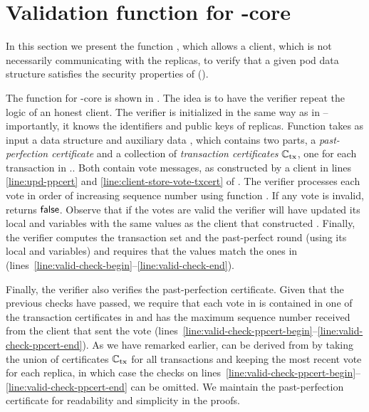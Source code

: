 \section{Validation function for \podtm-core}\label{sec:pod-core-valid}
In this section we present the function \opValid{}, which allows a \podtm client, which is not necessarily communicating with the \podtm replicas, to verify that a given pod data structure \Pod satisfies the security properties of \podtm ().



The function \opValid{} for \podtm-core is shown in .
The idea is to have the verifier repeat the logic of an honest client.
The verifier is initialized in the same way as in  -- importantly, it knows the identifiers and public keys of \podtm replicas.
Function \opValid{} takes as input a \podtm data structure \Pod and auxiliary data \cert,
which contains two parts, a \emph{past-perfection certificate} \ppcert and a collection of \emph{transaction certificates} $\mathbb{C}_\text{tx}$, one for each transaction in \Pod.\txSet.
Both contain vote messages, as constructed by a \podtm client in lines \ref{line:upd-ppcert} and \ref{line:client-store-vote-txcert} of .
The verifier processes each vote in order of increasing sequence number \sn using function \opProcessVote{}. If any vote is invalid, \opValid{} returns $\mathsf{false}$.
Observe that if the votes are valid the verifier will have updated its local \tsps and \mrt variables with the same values as the \podtm client that constructed \Pod.
Finally, the verifier computes the transaction set \txSet and the past-perfect round \rperf (using its local \tsps and \mrt variables) and requires that the values match the ones in \Pod (lines~\ref{line:valid-check-begin}--\ref{line:valid-check-end}).

Finally, the verifier also verifies the past-perfection certificate. Given that the previous checks have passed, we require that each vote in \ppcert is contained in one of the transaction certificates in \alltxcert and has the maximum sequence number received from the client that sent the vote (lines~\ref{line:valid-check-ppcert-begin}--\ref{line:valid-check-ppcert-end}).
As we have remarked earlier, \ppcert can be derived from \alltxcert by taking the union of certificates $\mathbb{C}_\text{tx}$ for all transactions and keeping the most recent vote for each replica, in which case the checks on lines~\ref{line:valid-check-ppcert-begin}--\ref{line:valid-check-ppcert-end} can be omitted. We maintain the past-perfection certificate for readability and simplicity in the proofs.